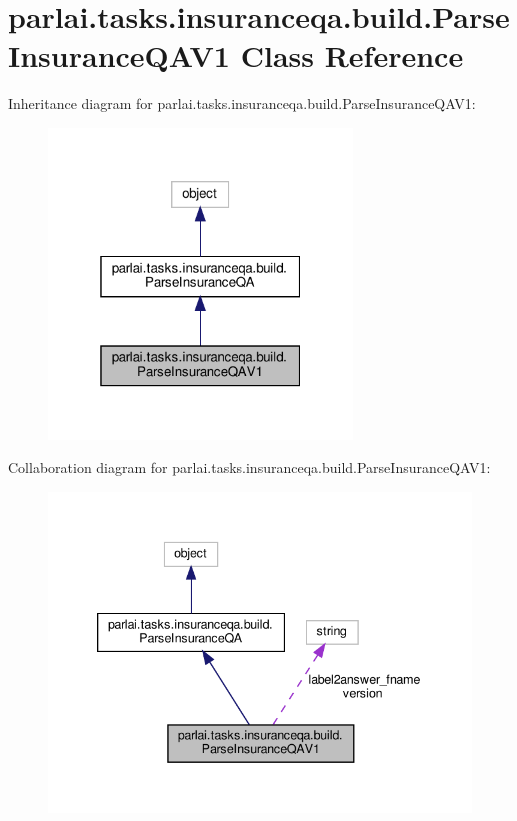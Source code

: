 \hypertarget{classparlai_1_1tasks_1_1insuranceqa_1_1build_1_1ParseInsuranceQAV1}{}\section{parlai.\+tasks.\+insuranceqa.\+build.\+Parse\+Insurance\+Q\+A\+V1 Class Reference}
\label{classparlai_1_1tasks_1_1insuranceqa_1_1build_1_1ParseInsuranceQAV1}


Inheritance diagram for parlai.\+tasks.\+insuranceqa.\+build.\+Parse\+Insurance\+Q\+A\+V1\+:
\nopagebreak
\begin{figure}[H]
\begin{center}
\leavevmode
\includegraphics[width=229pt]{df/db2/classparlai_1_1tasks_1_1insuranceqa_1_1build_1_1ParseInsuranceQAV1__inherit__graph}
\end{center}
\end{figure}


Collaboration diagram for parlai.\+tasks.\+insuranceqa.\+build.\+Parse\+Insurance\+Q\+A\+V1\+:
\nopagebreak
\begin{figure}[H]
\begin{center}
\leavevmode
\includegraphics[width=339pt]{d6/df0/classparlai_1_1tasks_1_1insuranceqa_1_1build_1_1ParseInsuranceQAV1__coll__graph}
\end{center}
\end{figure}
